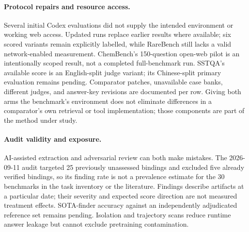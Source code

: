 \paragraph{Protocol repairs and resource access.}
Several initial Codex evaluations did not supply the intended environment or working web
access. Updated runs replace earlier results where available; six scored variants remain
explicitly labelled, while RareBench still lacks a valid network-enabled measurement. ChemBench's
150-question open-web pilot is an intentionally scoped result, not a completed full-benchmark
run. SSTQA's available score is an English-split judge variant; its Chinese-split primary
evaluation remains pending. Comparator patches, unavailable case banks,
different judges, and answer-key revisions are documented per row. Giving both arms the
benchmark's environment does not eliminate differences in a comparator's own retrieval or tool
implementation; those components are part of the method under study.

\paragraph{Audit validity and exposure.}
AI-assisted extraction and adversarial review can both make mistakes. The 2026-09-11 audit
targeted 25 previously unassessed bindings and excluded five already verified bindings, so its
finding rate is not a prevalence estimate for the 30 benchmarks in the task inventory or the literature.
Findings describe artifacts at a particular date; their severity and expected score direction
are not measured treatment effects. SOTA-finder accuracy against an independently adjudicated
reference set remains pending. Isolation and trajectory scans reduce runtime answer leakage
but cannot exclude pretraining contamination.
